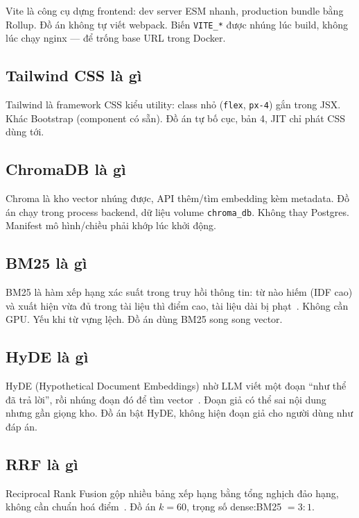 Vite là công cụ dựng frontend: dev server ESM nhanh, production bundle bằng
Rollup. Đồ án không tự viết webpack. Biến \texttt{VITE\_*} được nhúng lúc build,
không lúc chạy nginx --- để trống base URL trong Docker.

\subsection{Tailwind CSS là gì}

Tailwind là framework CSS kiểu utility: class nhỏ (\texttt{flex},
\texttt{px-4}) gắn trong JSX. Khác Bootstrap (component có sẵn). Đồ án tự bố
cục, bản 4, JIT chỉ phát CSS dùng tới.

\subsection{ChromaDB là gì}

Chroma là kho vector nhúng được, API thêm/tìm embedding kèm metadata. Đồ án
chạy trong process backend, dữ liệu volume \texttt{chroma\_db}. Không thay
Postgres. Manifest mô hình/chiều phải khớp lúc khởi động.

\subsection{BM25 là gì}

BM25 là hàm xếp hạng xác suất trong truy hồi thông tin: từ nào hiếm (IDF cao)
và xuất hiện vừa đủ trong tài liệu thì điểm cao, tài liệu dài bị phạt~\cite{robertson2009bm25}.
Không cần GPU. Yếu khi từ vựng lệch. Đồ án dùng BM25 song song vector.

\subsection{HyDE là gì}

HyDE (Hypothetical Document Embeddings) nhờ LLM viết một đoạn ``như thể đã trả
lời'', rồi nhúng đoạn đó để tìm vector~\cite{gao2023hyde}. Đoạn giả có thể sai
nội dung nhưng gần giọng kho. Đồ án bật HyDE, không hiện đoạn giả cho người dùng
như đáp án.

\subsection{RRF là gì}

Reciprocal Rank Fusion gộp nhiều bảng xếp hạng bằng tổng nghịch đảo hạng, không
cần chuẩn hoá điểm~\cite{cormack2009rrf}. Đồ án $k=60$, trọng số dense:BM25
$=3:1$.

